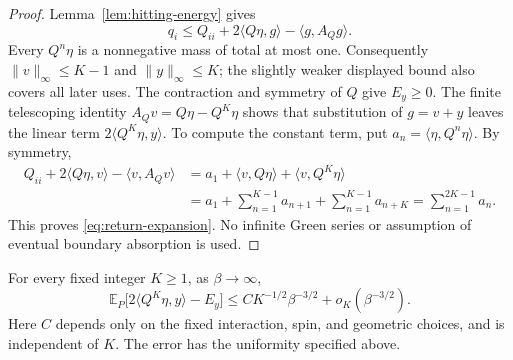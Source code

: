 \begin{proof}
Lemma~\ref{lem:hitting-energy} gives
\[
 q_i\le Q_{ii}+2\langle Q\eta,g\rangle
                  -\langle g,A_Qg\rangle.
\]
Every \(Q^n\eta\) is a nonnegative mass of total at most one.
Consequently \(\|v\|_\infty\le K-1\) and
\(\|y\|_\infty\le K\); the slightly weaker displayed bound also
covers all later uses. The contraction and symmetry of \(Q\) give
\(E_y\ge0\). The finite telescoping identity
\(A_Qv=Q\eta-Q^K\eta\) shows that substitution of \(g=v+y\)
leaves the linear term \(2\langle Q^K\eta,y\rangle\). To compute
the constant term, put \(a_n=\langle\eta,Q^n\eta\rangle\). By
symmetry,
\begin{align*}
 Q_{ii}+2\langle Q\eta,v\rangle-\langle v,A_Qv\rangle
 &=a_1+\langle v,Q\eta\rangle+\langle v,Q^K\eta\rangle\\
 &=a_1+\sum_{n=1}^{K-1}a_{n+1}+\sum_{n=1}^{K-1}a_{n+K}
   =\sum_{n=1}^{2K-1}a_n.
\end{align*}
This proves \eqref{eq:return-expansion}. No infinite Green series or
assumption of eventual boundary absorption is used.
\end{proof}

\begin{proposition}\label{prop:long-tail}
For every fixed integer \(K\ge1\), as \(\beta\to\infty\),
\begin{equation}\label{eq:long-tail}
 \mathbb E_P\bigl[2\langle Q^K\eta,y\rangle-E_y\bigr]
 \le C K^{-1/2}\beta^{-3/2}+o_K(\beta^{-3/2}).
\end{equation}
Here \(C\) depends only on the fixed interaction, spin, and geometric
choices, and is independent of \(K\). The error has the uniformity
specified above.
\end{proposition}

